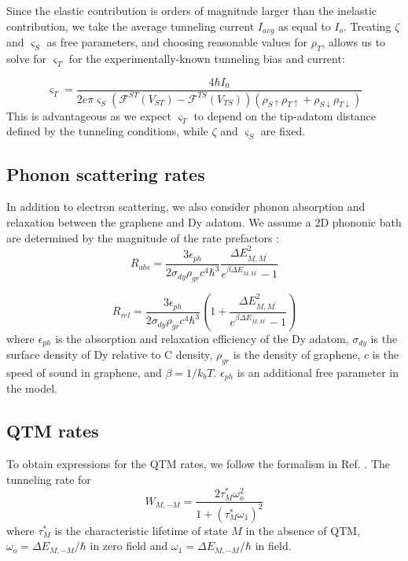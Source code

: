 \documentclass[reprint,amsmath,amssymb,aps,nofootinbib,onecolumn]{revtex4-2}
\begin{document}
Since the elastic contribution is orders of magnitude larger than the inelastic contribution, we take the average tunneling current $I_{avg}$ as equal to $I_{o}$. Treating $\zeta$ and $\varsigma_{S}$ as free parameters, and choosing reasonable values for $\rho_T$, allows us to solve for $\varsigma_{T}$ for the experimentally-known tunneling bias and current:

\begin{equation}
\varsigma_{T} =  \dfrac{4 \hbar I_0}{2 e \pi \varsigma_{S} \left( \mathcal{F}^{ST}(V_{ST})-\mathcal{F}^{TS}(V_{TS}) \right)\left( \rho_{S \uparrow} \rho_{T\uparrow} + \rho_{S \downarrow} \rho_{T\downarrow} \right)}
\label{eq:el_rate}
\end{equation} 
This is advantageous as we expect $\varsigma_{T}$ to depend on the tip-adatom distance defined by the tunneling conditions, while $\zeta$ and $\varsigma_{S}$ are fixed.  

\subsection{Phonon scattering rates}
\label{phonon}
In addition to electron scattering, we also consider phonon absorption and relaxation between the graphene and Dy adatom. We assume a 2D phononic bath are determined by the magnitude of the rate prefactors \cite{cervetti2016,fort1998}: 
\begin{equation}
R_{abs} =  \frac{3 \epsilon_{ph}}{2\sigma_{dy} \rho_{gr} c^4 \hbar^3} \frac{\Delta E_{M,M^{\prime}}^2}{e^{\beta \Delta E_{M,M^{\prime}}} - 1} 
\end{equation}

\begin{equation}
R_{rel} =  \frac{3 \epsilon_{ph}}{2\sigma_{dy} \rho_{gr} c^4 \hbar^3} \left( 1 + \frac{\Delta E_{M,M^{\prime}}^2}{e^{\beta \Delta E_{M,M^{\prime}}} - 1}\right)
\end{equation}
\noindent
where $\epsilon_{ph}$ is the absorption and relaxation efficiency of the Dy adatom, $\sigma_{dy}$ is the surface density of Dy relative to C density, $\rho_{gr}$ is the density of graphene, $c$ is the speed of sound in graphene, and $\beta = 1/ k_{b} T$. $\epsilon_{ph}$ is an additional free parameter in the model.\par

\subsection{QTM rates}
To obtain expressions for the QTM rates, we follow the formalism in Ref. \cite{abragam1961,fort1998}. The tunneling rate for 
\begin{equation}
W_{M,-M} =  \frac{2 \tau^{*}_{M} \omega^{2}_{o}}{1 + (\tau^{*}_{M} \omega_{1})^2}
\label{eq:qtm}
\end{equation}
where $\tau^{*}_{M}$ is the characteristic lifetime of state $M$ in the absence of QTM, $\omega_{o} = \Delta E_{M,-M}/\hbar$ in zero field and $\omega_{1} = \Delta E_{M,-M}/\hbar$ in field. 
\end{document}
